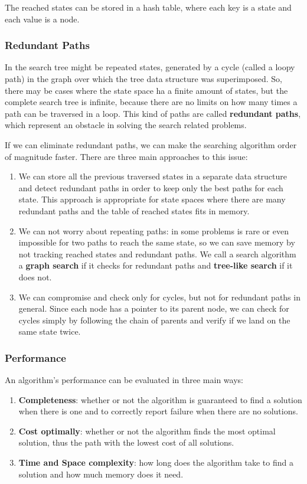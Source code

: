 \documentclass{article}
\begin{document}
The reached states can be stored in a hash table, where each key is a state and each value is a node.

\subsubsection{Redundant Paths}
In the search tree might be repeated states, generated by a cycle (called a loopy path) in the graph over which the tree data structure was superimposed. So, there may be cases where the state space ha a finite amount of states, but the complete search tree is infinite, because there are no limits on how many times a path can be traversed in a loop. This kind of paths are called \textbf{redundant paths}, which represent an obstacle in solving the search related problems. 

If we can eliminate redundant paths, we can make the searching algorithm order of magnitude faster. There are three main approaches to this issue:
\begin{enumerate}
    \item We can store all the previous traversed states in a separate data structure and detect redundant paths in order to keep only the best paths for each state. This approach is appropriate for state spaces where there are many redundant paths and the table of reached states fits in memory.
    \item We can not worry about repeating paths: in some problems is rare or even impossible for two paths to reach the same state, so we can save memory by not tracking reached states and redundant paths. We call a search algorithm a \textbf{graph search} if it checks for redundant paths and \textbf{tree-like search} if it does not.
    \item We can compromise and check only for cycles, but not for redundant paths in general. Since each node has a pointer to its parent node, we can check for cycles simply by following the chain of parents and verify if we land on the same state twice.
\end{enumerate}

\subsubsection{Performance}
An algorithm's performance can be evaluated in three main ways:
\begin{enumerate}
    \item \textbf{Completeness}: whether or not the algorithm is guaranteed to find a solution when there is one and to correctly report failure when there are no solutions.
    \item \textbf{Cost optimally}: whether or not the algorithm finds the most optimal solution, thus the path with the lowest cost of all solutions.
    \item \textbf{Time and Space complexity}: how long does the algorithm take to find a solution and how much memory does it need.
\end{enumerate}
\end{document}
